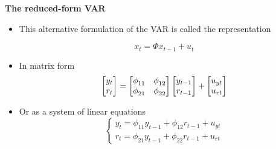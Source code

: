 
\begin{frame}
{\textbf{The reduced-form VAR}}\bigskip

\begin{itemize}
\item This alternative formulation of the VAR is called the {%
}
representation 
\begin{equation*}
x_{t}=\Phi x_{t-1}+u_{t}
\end{equation*}%
\pause

\item In matrix form%
\begin{equation*}
\begin{bmatrix}
y_{t} \\ 
r_{t}%
\end{bmatrix}%
=%
\begin{bmatrix}
\phi _{11} & \phi _{12} \\ 
\phi _{21} & \phi _{22}%
\end{bmatrix}%
\begin{bmatrix}
y_{t-1} \\ 
r_{t-1}%
\end{bmatrix}%
+%
\begin{bmatrix}
u_{yt} \\ 
u_{rt}%
\end{bmatrix}%
\medskip
\end{equation*}

\item Or as a system of linear equations%
\begin{equation*}
\left\{ 
\begin{array}{c}
y_{t}=\phi _{11}y_{t-1}+\phi _{12}r_{t-1}+u_{yt} \\ 
r_{t}=\phi _{21}y_{t-1}+\phi _{22}r_{t-1}+u_{rt}%
\end{array}%
\right.
\end{equation*}
\end{itemize}
\end{frame}


